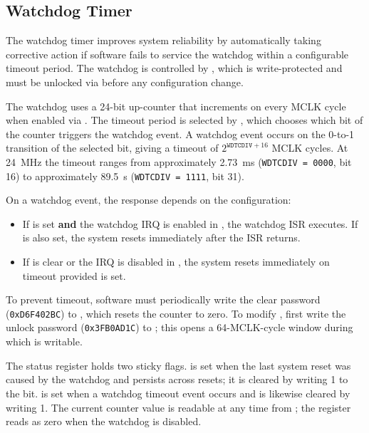\subsection{Watchdog Timer}

The watchdog timer improves system reliability by automatically taking corrective action if software fails to service the watchdog within a configurable timeout period. The watchdog is controlled by , which is write-protected and must be unlocked via  before any configuration change.

The watchdog uses a 24-bit up-counter that increments on every MCLK cycle when enabled via . The timeout period is selected by , which chooses which bit of the counter triggers the watchdog event. A watchdog event occurs on the 0-to-1 transition of the selected bit, giving a timeout of $2^{\texttt{WDTCDIV}+16}$ MCLK cycles. At 24~\si{\mega\hertz} the timeout ranges from approximately 2.73~\si{\milli\second} (\texttt{WDTCDIV = 0000}, bit 16) to approximately 89.5~\si{\second} (\texttt{WDTCDIV = 1111}, bit 31).

On a watchdog event, the response depends on the configuration:
\begin{itemize}
  \item If  is set \textbf{and} the watchdog IRQ is enabled in , the watchdog ISR executes. If  is also set, the system resets immediately after the ISR returns.
  \item If  is clear or the IRQ is disabled in , the system resets immediately on timeout provided  is set.
\end{itemize}

To prevent timeout, software must periodically write the clear password (\texttt{0xD6F402BC}) to , which resets the counter to zero. To modify , first write the unlock password (\texttt{0x3FB0AD1C}) to ; this opens a 64-MCLK-cycle window during which  is writable.

The  status register holds two sticky flags.  is set when the last system reset was caused by the watchdog and persists across resets; it is cleared by writing 1 to the bit.  is set when a watchdog timeout event occurs and is likewise cleared by writing 1. The current counter value is readable at any time from ; the register reads as zero when the watchdog is disabled.
